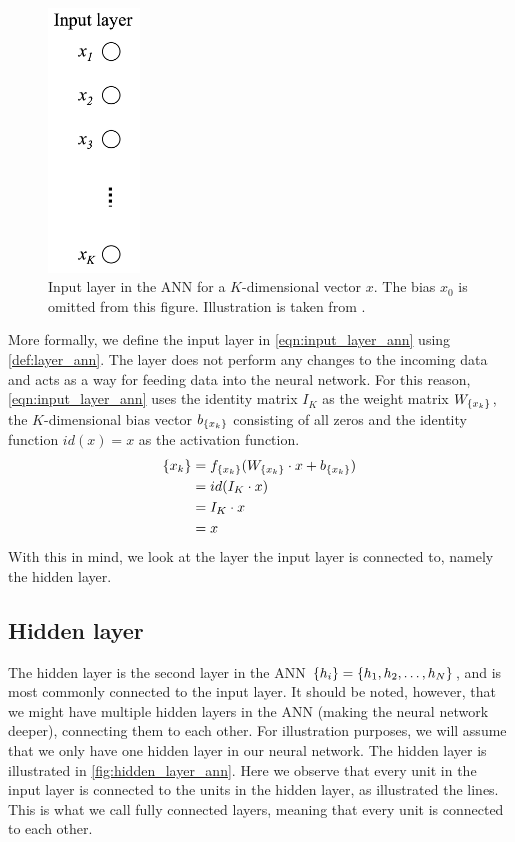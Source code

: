 \begin{figure}[H]
    \centering
    \includegraphics[height=7cm]{thesis/figures/ann-input-layer-rong-2014.png}
    \caption{Input layer in the ANN for a $K$-dimensional vector $x$. The bias $x_0$ is omitted from this figure. Illustration is taken from \cite[Figure 6]{rong2016word2vec}.}
    \label{fig:input_layer_ann}
\end{figure}

More formally, we define the input layer in \cref{eqn:input_layer_ann} using \cref{def:layer_ann}. The layer does not perform any changes to the incoming data and acts as a way for feeding data into the neural network. For this reason, \cref{eqn:input_layer_ann} uses the identity matrix $I_K$ as the weight matrix $W_{\left\{ {x}_{k} \right\}}$, the $K$-dimensional bias vector $b_{\left\{ {x}_{k} \right\}}$ consisting of all zeros and the identity function $id(x)=x$ as the activation function.
\begin{align}
    \label{eqn:input_layer_ann}
    \left\{ {x}_{k} \right\}
    &= f_{\left\{ {x}_{k} \right\}}(W_{\left\{ {x}_{k} \right\}} \cdot x + b_{\left\{ {x}_{k} \right\}}) \\
    &= id(I_K \cdot x) \\
    &= I_K \cdot x \\
    &= x
\end{align}
With this in mind, we look at the layer the input layer is connected to, namely the hidden layer.

\subsection{Hidden layer}
The hidden layer is the second layer in the ANN $\left\{ {h}_{i} \right\} = \left\{ h_1, h_2, \ldots, h_N \right\}$, and is most commonly connected to the input layer. It should be noted, however, that we might have multiple hidden layers in the ANN (making the neural network deeper), connecting them to each other. For illustration purposes, we will assume that we only have one hidden layer in our neural network. The hidden layer is illustrated in \cref{fig:hidden_layer_ann}. Here we observe that every unit in the input layer is connected to the units in the hidden layer, as illustrated the lines. This is what we call fully connected layers, meaning that every unit is connected to each other.

